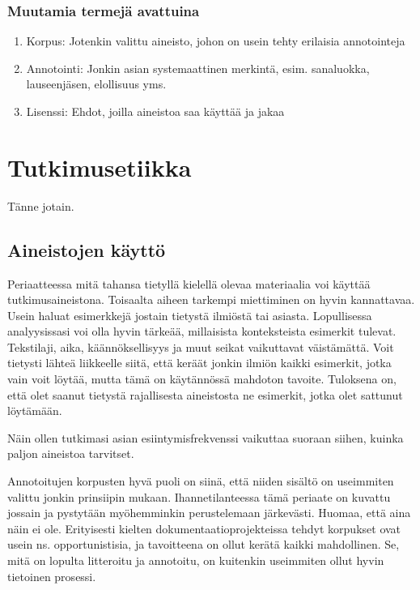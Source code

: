 \documentclass[]{book}
\providecommand{\tightlist}{%
  \setlength{\itemsep}{0pt}\setlength{\parskip}{0pt}}
\begin{document}
\hypertarget{muutamia-termeja-avattuina}{%
\subsection{Muutamia termejä
avattuina}\label{muutamia-termeja-avattuina}}

\begin{enumerate}
\def\labelenumi{\arabic{enumi}.}
\tightlist
\item
  Korpus: Jotenkin valittu aineisto, johon on usein tehty erilaisia
  annotointeja
\item
  Annotointi: Jonkin asian systemaattinen merkintä, esim. sanaluokka,
  lauseenjäsen, elollisuus yms.
\item
  Lisenssi: Ehdot, joilla aineistoa saa käyttää ja jakaa
\end{enumerate}

\hypertarget{tutkimusetiikka}{%
\chapter{Tutkimusetiikka}\label{tutkimusetiikka}}

Tänne jotain.

\hypertarget{aineistojen-kaytto}{%
\section{Aineistojen käyttö}\label{aineistojen-kaytto}}

Periaatteessa mitä tahansa tietyllä kielellä olevaa materiaalia voi
käyttää tutkimusaineistona. Toisaalta aiheen tarkempi miettiminen on
hyvin kannattavaa. Usein haluat esimerkkejä jostain tietystä ilmiöstä
tai asiasta. Lopullisessa analyysissasi voi olla hyvin tärkeää,
millaisista konteksteista esimerkit tulevat. Tekstilaji, aika,
käännöksellisyys ja muut seikat vaikuttavat väistämättä. Voit tietysti
lähteä liikkeelle siitä, että keräät jonkin ilmiön kaikki esimerkit,
jotka vain voit löytää, mutta tämä on käytännössä mahdoton tavoite.
Tuloksena on, että olet saanut tietystä rajallisesta aineistosta ne
esimerkit, jotka olet sattunut löytämään.

Näin ollen tutkimasi asian esiintymisfrekvenssi vaikuttaa suoraan
siihen, kuinka paljon aineistoa tarvitset.

Annotoitujen korpusten hyvä puoli on siinä, että niiden sisältö on
useimmiten valittu jonkin prinsiipin mukaan. Ihannetilanteessa tämä
periaate on kuvattu jossain ja pystytään myöhemminkin perustelemaan
järkevästi. Huomaa, että aina näin ei ole. Erityisesti kielten
dokumentaatioprojekteissa tehdyt korpukset ovat usein ns.
opportunistisia, ja tavoitteena on ollut kerätä kaikki mahdollinen. Se,
mitä on lopulta litteroitu ja annotoitu, on kuitenkin useimmiten ollut
hyvin tietoinen prosessi.
\end{document}
